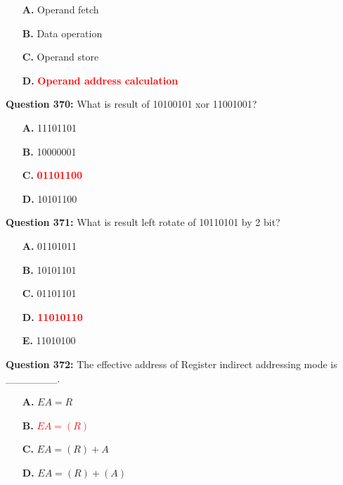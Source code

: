 \documentclass[12pt,a4paper]{article}
\begin{document}
\begin{itemize}
    \item[\textbf{A.}] Operand fetch
    \item[\textbf{B.}] Data operation
    \item[\textbf{C.}] Operand store
    \item[\textbf{D.}] \textcolor{red}{\textbf{Operand address calculation}}
\end{itemize}

\vspace{0.5cm}

\textbf{Question 370:} What is result of 10100101 xor 11001001?

\begin{itemize}
    \item[\textbf{A.}] 11101101
    \item[\textbf{B.}] 10000001
    \item[\textbf{C.}] \textcolor{red}{\textbf{01101100}}
    \item[\textbf{D.}] 10101100
\end{itemize}

\vspace{0.5cm}

\textbf{Question 371:} What is result left rotate of 10110101 by 2 bit?

\begin{itemize}
    \item[\textbf{A.}] 01101011
    \item[\textbf{B.}] 10101101
    \item[\textbf{C.}] 01101101
    \item[\textbf{D.}] \textcolor{red}{\textbf{11010110}}
    \item[\textbf{E.}] 11010100
\end{itemize}

\vspace{0.5cm}

\textbf{Question 372:} The effective address of Register indirect addressing mode is _______.

\begin{itemize}
    \item[\textbf{A.}] $EA = R$
    \item[\textbf{B.}] \textcolor{red}{\textbf{$EA = (R)$}}
    \item[\textbf{C.}] $EA = (R) + A$
    \item[\textbf{D.}] $EA = (R) + (A)$
\end{itemize}
\end{document}
